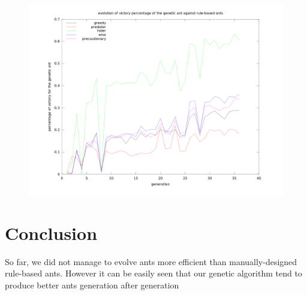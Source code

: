 \documentclass[10pt,a4paper]{article}
\begin{document}
\begin{figure}
\begin{center}
\includegraphics[scale=0.3]{../experiment/standardBestAnt.png}
\end{center}
\label{rules}
\end{figure}

\section*{Conclusion}

So far, we did not manage to evolve ants more efficient than
manually-designed rule-based ants. However it can be easily seen that
our genetic algorithm tend to produce better ants generation after
generation
\end{document}
